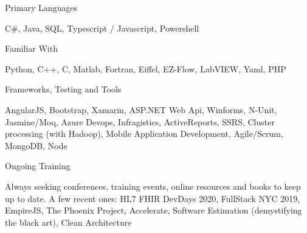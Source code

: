 
\begin{cventries}

  \cventry
    {Primary Languages} %
    {} %
    {} %
    {} %
    {
      \begin{cvitems} %
        \item {C\#, Java, SQL, Typescript / Javascript, Powershell}
      \end{cvitems}
    }
    
     \cventry
    {Familiar With} %
    {} %
    {} %
    {} %
    {
      \begin{cvitems} %
        \item {Python, C++, C, Matlab, Fortran, Eiffel, EZ-Flow, LabVIEW, Yaml, PHP}
      \end{cvitems}
    }
    
      \cventry
    {Frameworks, Testing and Tools} %
    {} %
    {} %
    {} %
    {
      \begin{cvitems} %
        \item {AngularJS, Bootstrap, Xamarin, ASP.NET Web Api, Winforms, N-Unit, Jasmine/Moq, Azure Devops, Infragistics, ActiveReports, SSRS, Cluster processing (with Hadoop), Mobile Application Development, Agile/Scrum, MongoDB, Node}
      \end{cvitems}
    }
    \cventry
    {Ongoing Training} %
    {} %
    {} %
    {} %
    {
      \begin{cvitems} %
        \item {Always seeking conferences, training events, online resources and books to keep up to date. A few recent ones: HL7 FHIR DevDays 2020, FullStack NYC 2019, EmpireJS, The Phoenix Project, Accelerate, Software Estimation (demystifying the black art), Clean Architecture }
      \end{cvitems}
    }
    
\end{cventries}

